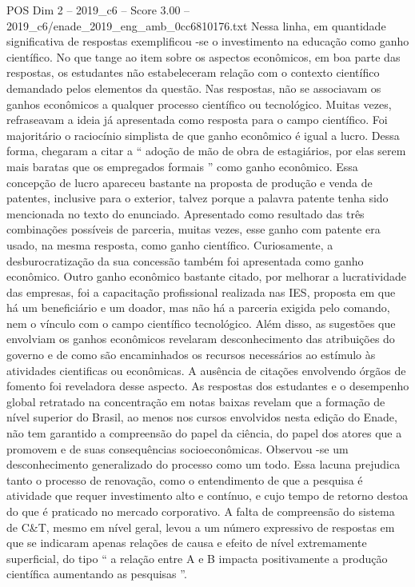 \begin{textsample}{POS Dim 2 – 2019\_c6 – Score 3.00 – 2019\_c6/enade\_2019\_eng\_amb\_0cc6810176.txt}
Nessa linha, em quantidade significativa de respostas exemplificou -se o investimento na educação como ganho científico.
No que tange ao item sobre os aspectos econômicos, em boa parte das respostas, os estudantes não estabeleceram relação com o contexto científico demandado pelos elementos da questão.
Nas respostas, não se associavam os ganhos econômicos a qualquer processo científico ou tecnológico.
Muitas vezes, refraseavam a ideia já apresentada como resposta para o campo científico.
Foi majoritário o raciocínio simplista de que ganho econômico é igual a lucro.
Dessa forma, chegaram a citar a “ adoção de mão de obra de estagiários, por elas serem mais baratas que os empregados formais ” como ganho econômico.
Essa concepção de lucro apareceu bastante na proposta de produção e venda de patentes, inclusive para o exterior, talvez porque a palavra patente tenha sido mencionada no texto do enunciado.
Apresentado como resultado das três combinações possíveis de parceria, muitas vezes, esse ganho com patente era usado, na mesma resposta, como ganho científico.
Curiosamente, a desburocratização da sua concessão também foi apresentada como ganho econômico.
Outro ganho econômico bastante citado, por melhorar a lucratividade das empresas, foi a capacitação profissional realizada nas IES, proposta em que há um beneficiário e um doador, mas não há a parceria exigida pelo comando, nem o vínculo com o campo científico tecnológico.
Além disso, as sugestões que envolviam os ganhos econômicos revelaram desconhecimento das atribuições do governo e de como são encaminhados os recursos necessários ao estímulo às atividades cientificas ou econômicas.
A ausência de citações envolvendo órgãos de fomento foi reveladora desse aspecto.
As respostas dos estudantes e o desempenho global retratado na concentração em notas baixas revelam que a formação de nível superior do Brasil, ao menos nos cursos envolvidos nesta edição do Enade, não tem garantido a compreensão do papel da ciência, do papel dos atores que a promovem e de suas consequências socioeconômicas.
Observou -se um desconhecimento generalizado do processo como um todo.
Essa lacuna prejudica tanto o processo de renovação, como o entendimento de que a pesquisa é atividade que requer investimento alto e contínuo, e cujo tempo de retorno destoa do que é praticado no mercado corporativo.
A falta de compreensão do sistema de C\&T, mesmo em nível geral, levou a um número expressivo de respostas em que se indicaram apenas relações de causa e efeito de nível extremamente superficial, do tipo “ a relação entre A e B impacta positivamente a produção científica aumentando as pesquisas ”.

\end{textsample}
